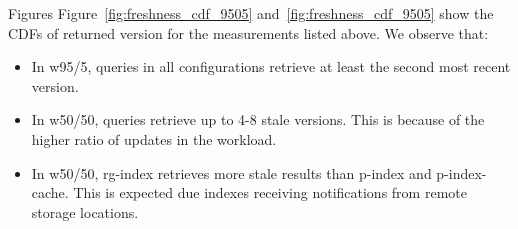 Figures Figure~\ref{fig:freshness_cdf_9505} and~\ref{fig:freshness_cdf_9505} show the CDFs of returned version for
the measurements listed above.
We observe that:

\begin{itemize}
  \item In w95/5, queries in all configurations retrieve at least the second most recent version.
  \item In w50/50, queries retrieve up to 4-8 stale versions. This is because of the higher ratio of updates in the
  workload.
  \item  In w50/50, rg-index retrieves more stale results than p-index and p-index-cache.
  This is expected due indexes receiving notifications from remote storage locations.
\end{itemize}








